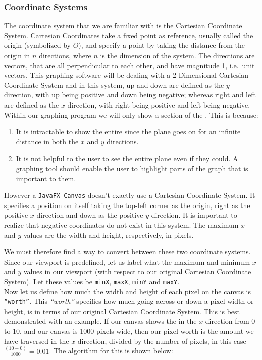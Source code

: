 \documentclass[../../../../../../main.tex]{subfiles}
\begin{document}
\subsubsection{Coordinate Systems}
The coordinate system that we are familiar with is the Cartesian Coordinate System. Cartesian Coordinates take a fixed point as reference, usually called the origin (symbolized by $O$), and specify a point by taking the distance from the origin in $n$ directions, where $n$ is the dimension of the system. The directions are vectors, that are all perpendicular to each other, and have magnitude 1, i.e.\ unit vectors. This graphing software will be dealing with a 2-Dimensional Cartesian Coordinate System and in this system, up and down are defined as the $y$ direction, with up being positive and down being negative; whereas right and left are defined as the $x$ direction, with right being positive and left being negative. Within our graphing program we will only show a section of the \xyplane. This is because:
\begin{enumerate}
\item It is intractable to show the entire \xyplane since the plane goes on for an infinite distance in both the $x$ and $y$ directions.
\item It is not helpful to the user to see the entire plane even if they could. A graphing tool should enable the user to highlight parts of the graph that is important to them.
\end{enumerate}
However a \texttt{JavaFX Canvas} doesn't exactly use a Cartesian Coordinate System. It specifies a position on itself taking the top-left corner as the origin, right as the positive $x$ direction and down as the positive $y$ direction. It is important to realize that negative coordinates do not exist in this system. The maximum $x$ and $y$ values are the width and height, respectively, in pixels.

We must therefore find a way to convert between these two coordinate systems. Since our viewport is predefined, let us label what the maximum and minimum $x$ and $y$ values in our viewport (with respect to our original Cartesian Coordinate System). Let these values be \texttt{minX}, \texttt{maxX}, \texttt{minY} and \texttt{maxY}.\\
Now let us define how much the width and height of each pixel on the canvas is \texttt{``worth''}. This \textit{``worth''} specifies how much going across or down a pixel width or height, is in terms of our original Cartesian Coordinate System. This is best demonstrated with an example. If our canvas shows the \xyplane in the $x$ direction from 0 to 10, and our canvas is 1000 pixels wide, then our pixel worth is the amount we have traversed in the $x$ direction, divided by the number of pixels, in this case $\frac{(10-0)}{1000} = 0.01$. The algorithm for this is shown below:
\end{document}
